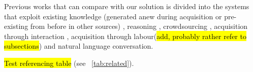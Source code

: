 Previous works that can compare with our solution is divided into the systems 
that exploit existing knowledge (generated anew during acquisition or 
pre-existing from before in other sources) \parencite{Singh2002a,Witbrock2003,
Forbus2007,Kvo2010,Sharma2010,Mitchel2015}, reasoning \parencite{Witbrock2003,
Speer2007,Speer2008,Kuo2010}, crowdsourcing \parencite{Singh2002,Speer2009, 
Kuo2010, Pedro2012a, Pedro2013}, acquisition through interaction 
\parencite{Speer2009,Pedro2012,Pedro2013}, acquisition through labour(\hl{add, 
probably rather refer to subsections}) \parencite{} and natural language 
conversation\parencite{Pedro2012, Speer2007,Speer2009, Witbrock2003,Kuo2010}.

\hl{Test referencing table} (see \tablename~\ref{tab:related}).

